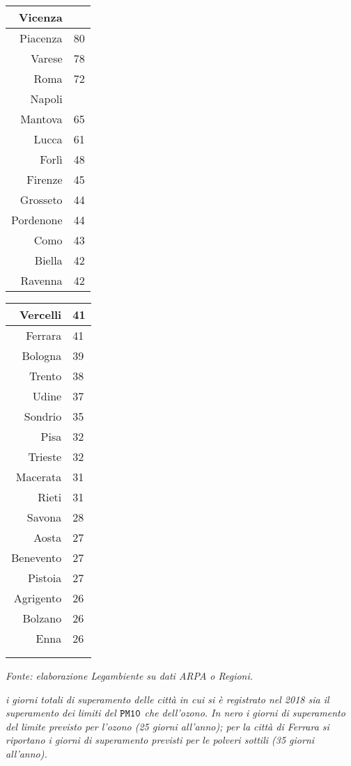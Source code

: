 \begin{table}
\begin{minipage}{0.29\textwidth}
\begin{tabular}{r|l}
			\hline
			Vicenza & \badvalue{82} \\
			\hline
			Piacenza & 80 \\
			\hline
			Varese & 78 \\
			\hline
			Roma & 72 \\
			\hline
			Napoli & \badvalue{72} \\
			\hline
			Mantova & 65 \\
			\hline
			Lucca & 61 \\
			\hline
			Forlì & 48 \\
			\hline
			Firenze & 45 \\
			\hline
			Grosseto & 44 \\
			\hline
			Pordenone & 44 \\
			\hline
			Como & 43 \\
			\hline
			Biella & 42 \\
			\hline
			Ravenna & 42 \\
			\hline
		\end{tabular}
	\end{minipage}
	\hfill
	\begin{minipage}{0.27\textwidth}
		\begin{tabular}{r|l}
			\hline
			Vercelli & 41 \\
			\hline
			Ferrara & 41 \\
			\hline
			Bologna & 39 \\
			\hline
			Trento & 38 \\
			\hline
			Udine & 37 \\
			\hline
			Sondrio & 35 \\
			\hline
			Pisa & 32 \\
			\hline
			Trieste & 32 \\
			\hline
			Macerata & 31 \\
			\hline
			Rieti & 31 \\
			\hline
			Savona & 28 \\
			\hline
			Aosta & 27 \\
			\hline
			Benevento & 27 \\
			\hline
			Pistoia & 27 \\
			\hline
			Agrigento & 26 \\
			\hline
			Bolzano & 26 \\
			\hline
			Enna & 26 \\
			\hline
			 & \\
			\hline
			 & \\
			\hline
		\end{tabular}
	\end{minipage}
	\par
	\bigskip
	\footnotesize
	\textit{Fonte: elaborazione Legambiente su dati ARPA o Regioni.}
	\par
	\textit{  i giorni totali di
	superamento delle città in cui si è registrato nel 2018 sia il
	superamento dei limiti del \(\mathtt{PM10}\) che dell'ozono. In nero i
	giorni di superamento del limite previsto per l'ozono (25 giorni
	all'anno); per la città di Ferrara si riportano i giorni di superamento
	previsti per le polveri sottili (35 giorni all'anno).}
\end{table}
